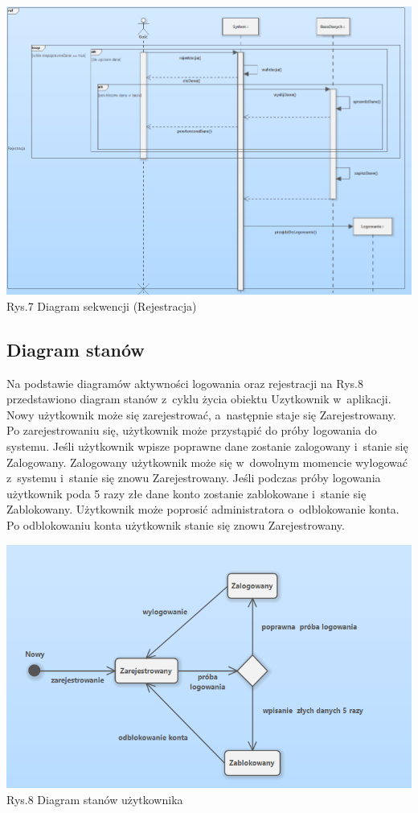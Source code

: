 \documentclass[12pt, letterpaper]{article}
\begin{document}
		\begin{center}
			\includegraphics[scale=0.6]{seqDiagramRejestracja}\\
			\caption{Rys.7 Diagram sekwencji (Rejestracja)}
		\end{center}
		
		\newpage		
		
		\subsection{Diagram stanów}
		
		Na podstawie diagramów aktywności logowania oraz rejestracji na Rys.8 przedstawiono diagram stanów z~cyklu życia obiektu Uzytkownik w~aplikacji.\\
		
		Nowy użytkownik może się zarejestrować, a~następnie staje się Zarejestrowany. Po zarejestrowaniu się, użytkownik może przystąpić do próby logowania do systemu. Jeśli użytkownik wpisze poprawne dane zostanie zalogowany i~stanie się Zalogowany. Zalogowany użytkownik może się w~dowolnym momencie wylogować z~systemu i~stanie się znowu Zarejestrowany. Jeśli podczas próby logowania użytkownik poda 5 razy złe dane konto zostanie zablokowane i~stanie się Zablokowany. Użytkownik może poprosić administratora o~odblokowanie konta. Po odblokowaniu konta użytkownik stanie się znowu Zarejestrowany.
		
		\begin{center}
			\includegraphics[scale=0.6]{activeDiagramUser}\\
			\caption{Rys.8 Diagram stanów użytkownika}
		\end{center}


 
\end{document}
